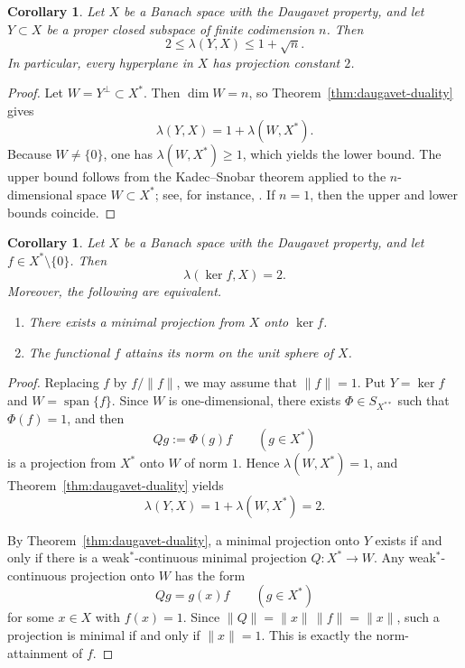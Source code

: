 \documentclass[11pt]{amsart}
\numberwithin{equation}{section}
\newtheorem{corollary}[theorem]{Corollary}
\theoremstyle{definition}
\theoremstyle{remark}
\DeclareMathOperator{\spanop}{span}
\begin{document}
\begin{corollary}
\label{thm:daugavet-bounds}
Let $X$ be a Banach space with the Daugavet property, and let $Y\subset X$ be a proper closed subspace of finite codimension $n$. Then
\[
2\leqslant \lambda(Y,X)\leqslant 1+\sqrt n.
\]
In particular, every hyperplane in $X$ has projection constant $2$.
\end{corollary}

\begin{proof}
Let $W=Y^\perp\subset X^*$. Then $\dim W=n$, so Theorem~\ref{thm:daugavet-duality} gives
\[
\lambda(Y,X)=1+\lambda(W,X^*).
\]
Because $W\neq\{0\}$, one has $\lambda(W,X^*)\geqslant 1$, which yields the lower bound. The upper bound follows from the Kadec--Snobar theorem applied to the $n$-dimensional space $W\subset X^*$; see, for instance, \cite{AK}. If $n=1$, then the upper and lower bounds coincide.
\end{proof}

\begin{corollary}
\label{cor:hyperplane}
Let $X$ be a Banach space with the Daugavet property, and let $f\in X^*\setminus\{0\}$. Then
\[
\lambda(\ker f,X)=2.
\]
Moreover, the following are equivalent.
\begin{enumerate}[label=\textup{(\roman*)}]
\item There exists a minimal projection from $X$ onto $\ker f$.
\item The functional $f$ attains its norm on the unit sphere of $X$.
\end{enumerate}
\end{corollary}

\begin{proof}
Replacing $f$ by $f/\|f\|$, we may assume that $\|f\|=1$. Put $Y=\ker f$ and $W=\spanop\{f\}$. Since $W$ is one-dimensional, there exists $\Phi\in S_{X^{**}}$ such that $\Phi(f)=1$, and then
\[
Qg:=\Phi(g)f
\qquad (g\in X^*)
\]
is a projection from $X^*$ onto $W$ of norm $1$. Hence $\lambda(W,X^*)=1$, and Theorem~\ref{thm:daugavet-duality} yields
\[
\lambda(Y,X)=1+\lambda(W,X^*)=2.
\]

By Theorem~\ref{thm:daugavet-duality}, a minimal projection onto $Y$ exists if and only if there is a weak$^*$-continuous minimal projection $Q\colon X^*\to W$. Any weak$^*$-continuous projection onto $W$ has the form
\[
Qg=g(x)f
\qquad (g\in X^*)
\]
for some $x\in X$ with $f(x)=1$. Since $\|Q\|=\|x\|\,\|f\|=\|x\|$, such a projection is minimal if and only if $\|x\|=1$. This is exactly the norm-attainment of $f$.
\end{proof}
\end{document}
